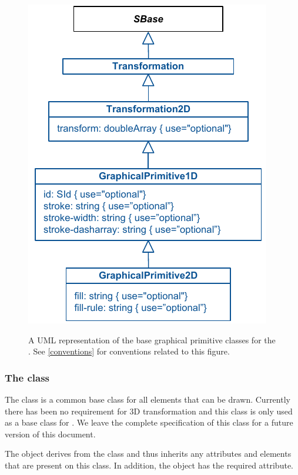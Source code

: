 \begin{figure}[!ht]
  \centering
  \includegraphics{images/render-base-classes-uml}\\
  \caption{A UML representation of the base graphical primitive classes for the \RenderPackage.  See \ref{conventions} for conventions related to this figure. }
  \label{fig:base_render_uml}
\end{figure}


\subsubsection{The  class}
\label{transformation-class}

The \Transformation class is a common base class for all elements that can be drawn.
Currently there has been no requirement for 3D transformation and this class is only used as a base class for \TransformationTwoD. We leave the complete specification of this class for a future version of this document.


The \Transformation object derives from the \SBase class and thus
inherits any attributes and elements that are present on this class.
In addition, the \Transformation object has the required  attribute.

